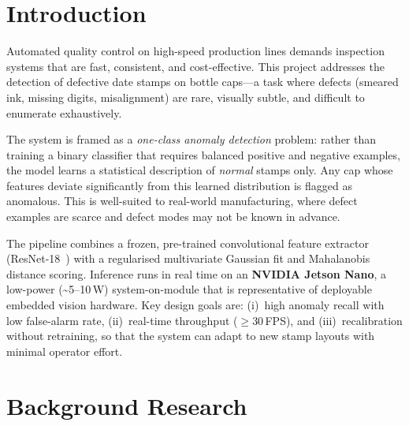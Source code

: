 
\setlength{\parskip}{2pt}
\setlength{\parindent}{1em}

\section{Introduction}

Automated quality control on high-speed production lines demands inspection
systems that are fast, consistent, and cost-effective. This project addresses
the detection of defective date stamps on bottle caps---a task where defects
(smeared ink, missing digits, misalignment) are rare, visually subtle, and
difficult to enumerate exhaustively.

The system is framed as a \emph{one-class anomaly detection} problem: rather
than training a binary classifier that requires balanced positive and negative
examples, the model learns a statistical description of \emph{normal} stamps
only. Any cap whose features deviate significantly from this learned
distribution is flagged as anomalous. This is well-suited to real-world
manufacturing, where defect examples are scarce and defect modes may not be
known in advance.

The pipeline combines a frozen, pre-trained convolutional feature extractor
(ResNet-18~\cite{he2016resnet}) with a regularised multivariate Gaussian fit
and Mahalanobis distance scoring. Inference runs in real time on an
\textbf{NVIDIA Jetson Nano}, a low-power (\textasciitilde 5--10\,W)
system-on-module that is representative of deployable embedded vision
hardware. Key design goals are: (i)~high anomaly recall with low false-alarm
rate, (ii)~real-time throughput ($\geq$30\,FPS), and (iii)~recalibration
without retraining, so that the system can adapt to new stamp layouts with
minimal operator effort.

\section{Background Research}

